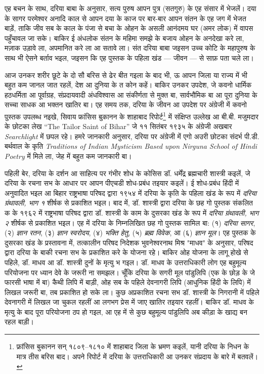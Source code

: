 एह बचन के साथ, दरिया बाबा के अनुसार, सत्य पुरुष आपन पुत्र (सतगुरु) के एह संसार में भेजलें। दया के सागर परमेश्वर अनादि काल से आपन दया के काज पर बार-बार आपन संतन के एह जग में भेजत बाड़ें, ताकि जीव सब के काल के पंजा से बचा के ओहन के असली आनंदमय घर (अमर लोक) में वापस पहुँचावल जा सके। बाकिर ई अंधलोक संतन के महिमा समझे के बजाय ओहन के अनदेखा करे ला, मज़ाक उड़ावे ला, अपमानित करे ला आ सतावे ला। संत दरिया बाबा जइसन उच्च कोटि के महापुरुष के साथ भी ऐसने बर्ताव भइल, जइसन कि एह पुस्तक के पहिला खंड — जीवन — से साफ़ पता चले ला।

आज उनकर शरीर छूटे के दो सौ बरिस से ढेर बीत गइला के बाद भी, ऊ आपन जिला या राज्य में भी बहुत कम जानल जात रहलें, देश आ दुनिया के त कोन कहें। बाकिर उनकर उपदेश, जे कवनो धार्मिक हठधर्मिता आ पूर्वाग्रह, संप्रदायवादी अंधविश्वास आ संकीर्णता से मुक्त बा, सार्वभौमिक बा आ पूरा दुनिया के सच्चा साधक आ भक्तन खातिर बा। एह समय तक, दरिया के जीवन आ उपदेश पर अंग्रेजी में कवनो पुस्तक उपलब्ध नइखे, सिवाय फ्रांसिस बुकानन के शाहाबाद रिपोर्ट\footnote{फ्रांसिस बुकानन सन् १८०९--१८१० में शाहाबाद जिला के भ्रमण कइलें, यानी दरिया के निधन के मात्र तीस बरिस बाद। अपने रिपोर्ट में दरिया के उत्तराधिकारी आ उनकर संप्रदाय के बारे में बतवलें।} में संक्षिप्त उल्लेख आ बी.बी. मजुमदार के छोटका लेख {\engfont ``The Tailor Saint of Bihar''} जे ११ सितंबर १९३५ के अंग्रेजी अखबार {\engfont \textit{Searchlight}} में छपल रहे। हमरे जानकारी अनुसार, दरिया पर अंग्रेजी में एगो अउरी छोटका संदर्भ पी.डी. बर्थवाल के कृति {\engfont \textit{Traditions of Indian Mysticism Based upon Nirguna School of Hindi Poetry}} में मिले ला, जेह में बहुत कम जानकारी बा।

पहिली बेर, दरिया के दर्शन आ साहित्य पर गंभीर शोध के कोसिस डॉ. धर्मेंद्र ब्रह्मचारी शास्त्री कइलें, जे दरिया के रचना सभ के आधार पर आपन पीएचडी शोध-प्रबंध तइयार कइलें। ई शोध-प्रबंध हिंदी में अनुवादित भइल आ बिहार राष्ट्रभाषा परिषद द्वारा १९५४ में दरिया के कृति के पहिला खंड के रूप में \textit{दरिया ग्रंथावली, भाग १} शीर्षक से प्रकाशित भइल। बाद में, डॉ. शास्त्री द्वारा दरिया के छह गो पुस्तक संकलित क के १९६२ में राष्ट्रभाषा परिषद द्वारा डॉ. शास्त्री के काम के दुसरका खंड के रूप में \textit{दरिया ग्रंथावली, भाग २} शीर्षक से प्रकाशित भइल। एह में दरिया के निम्नलिखित छह गो पुस्तक सामिल बा: (१) \textit{दरिया सागर}, (२) \textit{ज्ञान रतन}, (३) \textit{ज्ञान स्वरोदय}, (४) \textit{भक्ति हेतु}, (५) \textit{ब्रह्म विवेक}, आ (६) \textit{ज्ञान मूल}। एह पुस्तक के दुसरका खंड के प्रस्तावना में, तत्कालीन परिषद निदेशक भुवनेश्वरनाथ मिश्र "माधव" के अनुसार, परिषद द्वारा दरिया के बाकी रचना सभ के प्रकाशित करे के योजना रहे। बाकिर ओह योजना के लागू होखे से पहिले, डॉ. माधव आ डॉ. शास्त्री दुनों के मृत्यु भ गइल। डॉ. माधव के उत्तराधिकारी लोग एह बहुमूल्य परियोजना पर ध्यान देवे के जरूरी ना समझल। चूँकि दरिया के सगरी मूल पांडुलिपि (एक के छोड़ के जे फारसी भाषा में बा) कैथी लिपि में बाड़ी, ओह सब के पहिले देवनागरी लिपि (आधुनिक हिंदी के लिपि) में लिखल जरूरी बा, तब प्रकाशित हो सके ला। कुछ अप्रकाशित रचना सभ डॉ. शास्त्री के निगरानी में पहिले देवनागरी में लिखल जा चुकल रहलीं आ लगभग प्रेस में जाए खातिर तइयार रहलीं। बाकिर डॉ. माधव के मृत्यु के बाद पूरा परियोजना ठप हो गइल, आ एह में से कुछ बहुमूल्य पांडुलिपि अब कीड़ा के खाद्य बन रहल बाड़ी।

